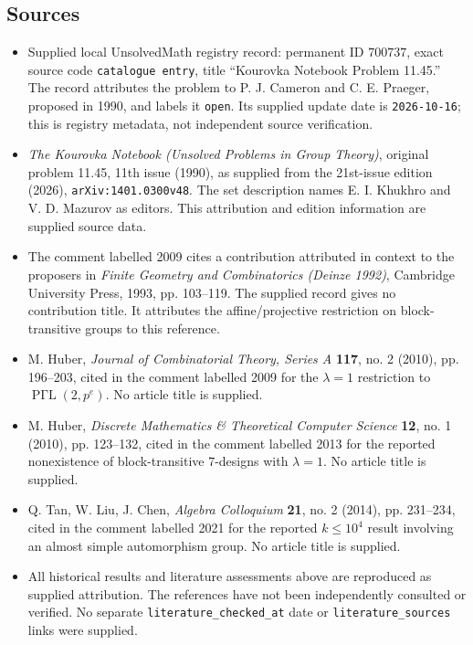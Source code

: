 \documentclass[11pt]{article}
\begin{document}
\subsection{Sources}
\begin{itemize}
\item Supplied local UnsolvedMath registry record: permanent ID \(700737\), exact source code \texttt{catalogue entry}, title ``Kourovka Notebook Problem 11.45.'' The record attributes the problem to P. J. Cameron and C. E. Praeger, proposed in 1990, and labels it \texttt{open}. Its supplied update date is \texttt{2026-10-16}; this is registry metadata, not independent source verification.
\item \emph{The Kourovka Notebook (Unsolved Problems in Group Theory)}, original problem 11.45, 11th issue (1990), as supplied from the 21st-issue edition (2026), \texttt{arXiv:1401.0300v48}. The set description names E. I. Khukhro and V. D. Mazurov as editors. This attribution and edition information are supplied source data.
\item The comment labelled 2009 cites a contribution attributed in context to the proposers in \emph{Finite Geometry and Combinatorics (Deinze 1992)}, Cambridge University Press, 1993, pp. 103--119. The supplied record gives no contribution title. It attributes the affine/projective restriction on block-transitive groups to this reference.
\item M. Huber, \emph{Journal of Combinatorial Theory, Series A} \textbf{117}, no. 2 (2010), pp. 196--203, cited in the comment labelled 2009 for the \(\lambda=1\) restriction to \(\operatorname{P\Gamma L}(2,p^e)\). No article title is supplied.
\item M. Huber, \emph{Discrete Mathematics \& Theoretical Computer Science} \textbf{12}, no. 1 (2010), pp. 123--132, cited in the comment labelled 2013 for the reported nonexistence of block-transitive \(7\)-designs with \(\lambda=1\). No article title is supplied.
\item Q. Tan, W. Liu, J. Chen, \emph{Algebra Colloquium} \textbf{21}, no. 2 (2014), pp. 231--234, cited in the comment labelled 2021 for the reported \(k\leq10^4\) result involving an almost simple automorphism group. No article title is supplied.
\item All historical results and literature assessments above are reproduced as supplied attribution. The references have not been independently consulted or verified. No separate \texttt{literature\_checked\_at} date or \texttt{literature\_sources} links were supplied.
\end{itemize}
\end{document}
